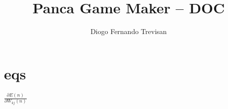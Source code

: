 \documentclass[a4paper,12pt]{report}%
\title{Panca Game Maker -- DOC}
\author{Diogo Fernando Trevisan}
\date{}
\begin{document}
	\begin{titlepage}
		\maketitle
	\end{titlepage}
	
	
	\section{eqs}
	
	$\frac{\partial E(n)}{\partial W_{kj}(n)}$
	
	
	
	
	
	
	
	
	
	
	
	
	
\end{document}

